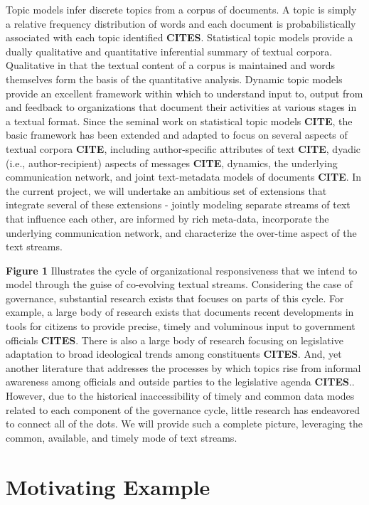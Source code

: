 Topic models infer discrete topics from a corpus of documents. A topic is simply a relative frequency distribution of words and each document is probabilistically associated with each topic identified {\bf CITES}. Statistical topic models provide a dually qualitative and quantitative inferential summary of textual corpora. Qualitative in that the textual content of a corpus is maintained and words themselves form the basis of the quantitative analysis.  Dynamic topic models provide an excellent framework within which to understand input to, output from and feedback to organizations that document their activities at various stages in a textual format. Since the seminal work on statistical topic models {\bf CITE}, the basic framework has been extended and adapted to focus on several aspects of textual corpora {\bf CITE}, including author-specific attributes of text {\bf CITE}, dyadic (i.e., author-recipient) aspects of messages {\bf CITE}, dynamics, the underlying communication network, and joint text-metadata models of documents {\bf CITE}. In the current project, we will undertake an ambitious set of extensions that integrate several of these extensions - jointly modeling separate streams of text that influence each other, are informed by rich meta-data, incorporate the underlying communication network, and characterize the over-time aspect of the text streams.

{\bf Figure 1} Illustrates the cycle of organizational responsiveness that we intend to model through the guise of co-evolving textual streams. Considering the case of governance, substantial research exists that focuses on parts of this cycle. For example, a large body of research exists that documents recent developments in tools for citizens to provide precise, timely and voluminous input to government officials {\bf CITES}. There is also a large body of research focusing on legislative adaptation to broad ideological trends among constituents {\bf CITES}.  And, yet another literature that addresses the processes by which topics rise from informal awareness among officials and outside parties to the legislative agenda {\bf CITES}.. However, due to the historical inaccessibility of timely and common data modes related to each component of the governance cycle, little research has endeavored to connect all of the dots. We will provide such a complete picture, leveraging the common, available, and timely mode of text streams.

\section{Motivating Example}

